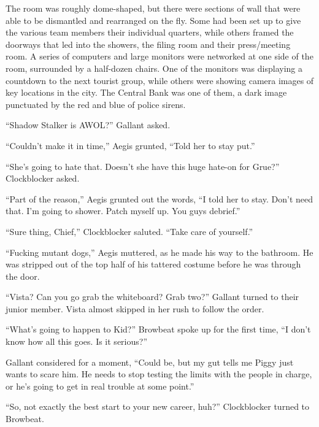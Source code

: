 The room was roughly dome-shaped, but there were sections of wall that were able to be dismantled and rearranged on the fly.  Some had been set up to give the various team members their individual quarters, while others framed the doorways that led into the showers, the filing room and their press/meeting room.  A series of computers and large monitors were networked at one side of the room, surrounded by a half-dozen chairs.  One of the monitors was displaying a countdown to the next tourist group, while others were showing camera images of key locations in the city.  The Central Bank was one of them, a dark image punctuated by the red and blue of police sirens.



``Shadow Stalker is AWOL?'' Gallant asked.



``Couldn't make it in time,'' Aegis grunted, ``Told her to stay put.''



``She's going to hate that.  Doesn't she have this huge hate-on for Grue?'' Clockblocker asked.



``Part of the reason,'' Aegis grunted out the words, ``I told her to stay.  Don't need that.  I'm going to shower.  Patch myself up.  You guys debrief.''



``Sure thing, Chief,'' Clockblocker saluted.  ``Take care of yourself.''



``Fucking mutant dogs,'' Aegis muttered, as he made his way to the bathroom.  He was stripped out of the top half of his tattered costume before he was through the door.



``Vista?  Can you go grab the whiteboard?  Grab two?'' Gallant turned to their junior member.  Vista almost skipped in her rush to follow the order.



``What's going to happen to Kid?'' Browbeat spoke up for the first time, ``I don't know how all this goes.  Is it serious?''



Gallant considered for a moment, ``Could be, but my gut tells me Piggy just wants to scare him.  He needs to stop testing the limits with the people in charge, or he's going to get in real trouble at some point.''



``So, not exactly the best start to your new career, huh?'' Clockblocker turned to Browbeat.



